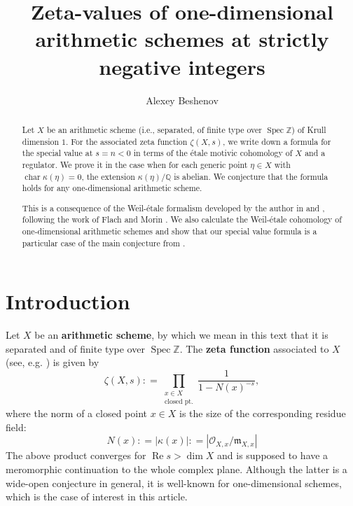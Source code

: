 \documentclass[draft]{article}
\title{Zeta-values of one-dimensional arithmetic schemes at strictly negative integers}
\author{Alexey Beshenov}
\DeclareMathOperator{\fchar}{char}
\DeclareMathOperator{\Spec}{Spec}
\newcommand{\QQ}{\mathbb{Q}}
\newcommand{\ZZ}{\mathbb{Z}}
\renewcommand{\Re}{\operatorname{Re}}
\newcommand{\dfn}{\mathrel{\mathop:}=}
\theoremstyle{myplain}
\theoremstyle{mydefinition}
\begin{document}
\maketitle

\begin{abstract}
  Let $X$ be an arithmetic scheme (i.e., separated, of finite type over
  $\Spec \ZZ$) of Krull dimension $1$. For the associated zeta function
  $\zeta (X,s)$, we write down a formula for the special value at $s = n < 0$ in
  terms of the \'{e}tale motivic cohomology of $X$ and a regulator. We prove it
  in the case when for each generic point $\eta \in X$ with
  $\fchar \kappa (\eta) = 0$, the extension $\kappa (\eta)/\QQ$ is
  abelian. We conjecture that the formula holds for any one-dimensional
  arithmetic scheme.

  This is a consequence of the Weil-\'{e}tale formalism developed by the author
  in \cite{Beshenov-Weil-etale-1} and \cite{Beshenov-Weil-etale-2}, following
  the work of Flach and Morin \cite{Flach-Morin-2018}. We also calculate the
  Weil-\'{e}tale cohomology of one-dimensional arithmetic schemes and show that
  our special value formula is a particular case of the main conjecture from
  \cite{Beshenov-Weil-etale-2}.
\end{abstract}



\section{Introduction}

Let $X$ be an \textbf{arithmetic scheme}, by which we mean in this text that it
is separated and of finite type over $\Spec \ZZ$.  The \textbf{zeta function}
associated to $X$ (see, e.g. \cite{Serre-1965}) is given by
\[ \zeta (X,s) \dfn \prod_{\substack{x \in X \\ \text{closed pt.}}}
  \frac{1}{1 - N (x)^{-s}}, \]
where the norm of a closed point $x\in X$ is the size of the corresponding
residue field:
$$N (x) \dfn |\kappa (x)| \dfn |\mathcal{O}_{X,x}/\mathfrak{m}_{X,x}|$$
The above product converges for $\Re s > \dim X$ and is supposed to have a
meromorphic continuation to the whole complex plane. Although the latter is a
wide-open conjecture in general, it is well-known for one-dimensional schemes,
which is the case of interest in this article.
\end{document}
